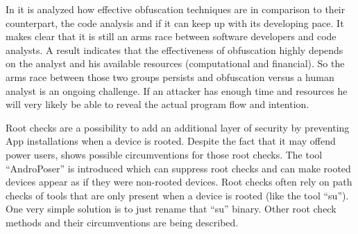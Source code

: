 In \parencite{obfucsation_vs_code_analysis} it is analyzed how effective obfuscation
techniques are in comparison to their counterpart, the code analysis and if it can
keep up with its developing pace. It makes clear that it is still an arms race between
software developers and code analysts. A result indicates that the effectiveness of
obfuscation highly depends on the analyst and his available resources (computational and
financial). So the arms race between those two groups persists and obfuscation versus
a human analyst is an ongoing challenge. If an attacker has enough time and resources he will very likely be able to reveal the actual program flow and intention.

Root checks are a possibility to add an additional layer of security by preventing App installations when a device is rooted. Despite the fact that it may offend power users,
\parencite{root_checks} shows possible circumventions for those root checks. The tool ``AndroPoser'' is introduced which can suppress root checks and can make rooted devices appear as if they were
non-rooted devices. Root checks often rely on path checks of tools that are only present when a device is rooted (like the tool ``su''). One very simple solution is to just rename that ``su'' binary. Other root check methods and their circumventions are being described.










